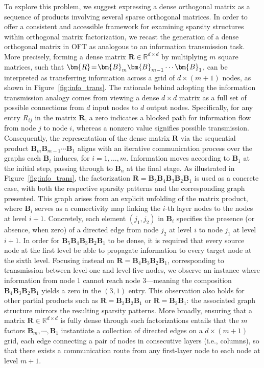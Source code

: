 To explore this problem, we suggest expressing a dense orthogonal matrix as a sequence of products involving several sparse orthogonal matrices. In order to offer a consistent and accessible framework for examining sparsity structures within orthogonal matrix factorization, we recast the generation of a dense orthogonal matrix in OFT as analogous to an information transmission task. More precisely, forming a dense matrix $\bm{R}\in\mathbb{R}^{d\times d}$ by multiplying $m$ square matrices, such that $\thickmuskip=2mu \medmuskip=2mu \bm{R}=\bm{B}_m\bm{B}_{m-1}\cdots\bm{B}_1$, can be interpreted as transferring information across a grid of $d\times (m+1)$ nodes, as shown in Figure~\ref{fig:info_trans}. The rationale behind adopting the information transmission analogy comes from viewing a dense $d \times d$ matrix as a full set of possible connections from $d$ input nodes to $d$ output nodes. Specifically, for any entry $R_{ij}$ in the matrix $\bm{R}$, a zero indicates a blocked path for information flow from node $j$ to node $i$, whereas a nonzero value signifies possible transmission. Consequently, the representation of the dense matrix $\bm{R}$ via the sequential product $\bm{B}_m\bm{B}_{m-1}\cdots\bm{B}_1$ aligns with an iterative communication process over the graphs each $\bm{B}_i$ induces, for $i=1,\dots,m$. Information moves according to $\bm{B}_1$ at the initial step, passing through to $\bm{B}_n$ at the final stage. As illustrated in Figure~\ref{fig:info_trans}, the factorization $\bm{R}=\bm{B}_5\bm{B}_4\bm{B}_3\bm{B}_2\bm{B}_1$ is used as a concrete case, with both the respective sparsity patterns and the corresponding graph presented. This graph arises from an explicit unfolding of the matrix product, where $\bm{B}_i$ serves as a connectivity map linking the $i$-th layer nodes to the nodes at level $i+1$. Concretely, each element $(j_1,j_2)$ in $\bm{B}_i$ specifies the presence (or absence, when zero) of a directed edge from node $j_2$ at level $i$ to node $j_1$ at level $i+1$. In order for $\bm{B}_5\bm{B}_4\bm{B}_3\bm{B}_2\bm{B}_1$ to be dense, it is required that every source node at the first level be able to propagate information to every target node at the sixth level. Focusing instead on $\bm{R}=\bm{B}_4\bm{B}_3\bm{B}_2\bm{B}_1$, corresponding to transmission between level-one and level-five nodes, we observe an instance where information from node $1$ cannot reach node $3$—meaning the composition $\bm{B}_4\bm{B}_3\bm{B}_2\bm{B}_1$ yields a zero in the $(3,1)$ entry. This observation also holds for other partial products such as $\bm{R}=\bm{B}_3\bm{B}_2\bm{B}_1$ or $\bm{R}=\bm{B}_2\bm{B}_1$: the associated graph structure mirrors the resulting sparsity patterns. More broadly, ensuring that a matrix $\bm{R}\in\mathbb{R}^{d\times d}$ is fully dense through such factorizations entails that the $m$ factors $\bm{B}_m,\cdots,\bm{B}_1$ instantiate a collection of directed edges on a $d\times (m+1)$ grid, each edge connecting a pair of nodes in consecutive layers (i.e., columns), so that there exists a communication route from any first-layer node to each node at level $m+1$.

